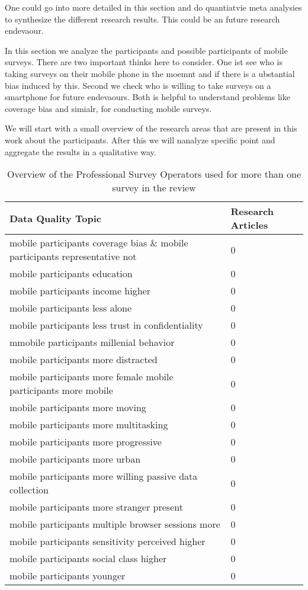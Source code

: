 One could go into more detailed in this section and do quantiatvie meta analysies to synthesize the different research results. This could be an future research endevaour. 


In this section we analyze the participants and possible participants of mobile surveys. There are two important thinks here to consider. One ist see who is taking surveys on their mobile phone in the moemnt and if there is a ubstantial bias induced by this. Second we check who is willing to take surveys on a smartphone for future endevaours. Both is helpful to understand problems like coverage bias and simialr, for conducting mobile surveys.

We will start with a small overview of the research areas that are present in this work about the participants. After this we will nanalyze specific point and aggregate the results in a qualitative way.



\begin{table}
	\centering
	\begin{tabular}{ll}
		\toprule
		Data Quality Topic  &  Research Articles \\
		\midrule
        mobile participants coverage bias \& mobile participants representative not    & 0  \\
        mobile participants education    & 0  \\
        mobile participants income higher   & 0  \\
        mobile participants less alone    & 0  \\
        mobile participants less trust in confidentiality    & 0  \\
        mmobile participants millenial behavior    & 0  \\
        mobile participants more distracted    & 0  \\
        mobile participants more female
        mobile participants more mobile    & 0  \\
        mobile participants more moving    & 0  \\
        mobile participants more multitasking    & 0  \\
        mobile participants more progressive    & 0  \\
        mobile participants more urban    & 0  \\
        mobile participants more willing passive data collection    & 0  \\
        mobile participants more stranger present    & 0  \\
        mobile participants multiple browser sessions more    & 0  \\
        mobile participants sensitivity perceived higher    & 0  \\
        mobile participants social class higher    & 0  \\
        mobile participants younger    & 0  \\
		\bottomrule 
	\end{tabular}
	\caption{Overview of the Professional Survey Operators used for more than one survey in the review}
	\label{tab: author}
\end{table}




